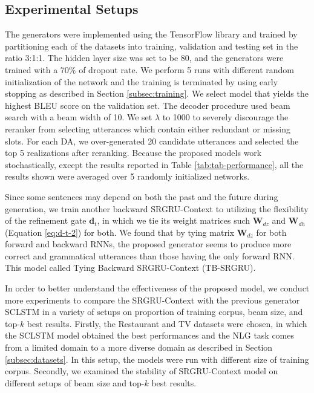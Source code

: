 \documentclass{llncs}
\begin{document}
\subsection{Experimental Setups}\label{subsec:experimental-setups}

The generators were implemented using the TensorFlow library \cite{abadi2016tensorflow} and trained by partitioning each of the datasets into training, validation and testing set in the ratio 3:1:1. The hidden layer size was set to be 80, and the generators were trained with a $70\%$ of dropout rate. We perform 5 runs with different random initialization of the network and the training is terminated by using early stopping as described in Section \ref{subsec:training}. We select model that yields the highest BLEU score on the validation set. The decoder procedure used beam search with a beam width of 10. We set $\lambda$ to 1000 to severely discourage the reranker from selecting utterances which contain either redundant or missing slots. For each DA, we over-generated 20 candidate utterances and selected the top 5 realizations after reranking. Because the proposed models work stochastically, except the results reported in Table \ref{tab:tab-performance}, all the results shown were averaged over 5 randomly initialized networks.

Since some sentences may depend on both the past and the future during generation, we train another backward SRGRU-Context to utilizing the flexibility of the refinement gate $\textbf{d}_{t}$, in which we tie its weight matrices such $\textbf{W}_{dz}$ and $\textbf{W}_{dh}$ (Equation \ref{eq:d-t-2}) for both. We found that by tying matrix $\textbf{W}_{dz}$ for both forward and backward RNNs, the proposed generator seems to produce more correct and grammatical utterances than those having the only forward RNN. This model called Tying Backward SRGRU-Context (TB-SRGRU). 

In order to better understand the effectiveness of the proposed model, we conduct more experiments to compare the SRGRU-Context with the previous generator SCLSTM in a variety of setups on proportion of training corpus, beam size, and top-$k$ best results. Firstly, the Restaurant and TV datasets were chosen, in which the SCLSTM model obtained the best performances and the NLG task comes from a limited domain to a more diverse domain as described in Section \ref{subsec:datasets}. In this setup, the models were run with different size of training corpus. Secondly, we examined the stability of SRGRU-Context model on different setups of beam size and top-$k$ best results. 
\end{document}
